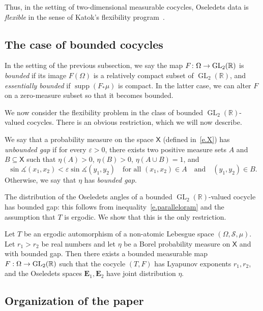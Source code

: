 \documentclass[AHL,Unicode,longabstracts,published]{cedram}
\DeclareMathOperator{\supp}{supp}
\newcommand{\R}{\mathbb{R}}
\newcommand{\E}{\mathbf{E}}
\newcommand{\sfX}{\mathsf{X}}
\newcommand{\clS}{\mathcal{S}}
\DeclareMathOperator{\GL}{GL}
\renewcommand{\epsilon}{\varepsilon}
\renewcommand{\angle}{\measuredangle}
\renewcommand*{\to}{\mathchoice{\longrightarrow}{\rightarrow}{\rightarrow}{\rightarrow}}
\DeclareMathOperator{\GL}{GL}
\newcommand{\R}{\mathbb{R}}
\begin{document}
Thus, in the setting of two-dimensional measurable cocycles, Oseledets data is \emph{flexible} in the sense of Katok's flexibility program~\cite{BKRH}.


\subsection{The case of bounded cocycles}

In the setting of the previous subsection, we say the map $F \colon \Omega \to \GL_2(\R)$ is \emph{bounded} if its image $F(\Omega)$ is a relatively compact subset of $\GL_2(\R)$, and \emph{essentially bounded} if $\supp(F_*\mu)$ is compact. In the latter case, we can alter $F$ on a zero-measure subset so that it becomes bounded.

We now consider the flexibility problem in the class of bounded $\GL_2(\R)$-valued cocycles. There is an obvious restriction, which we will now describe.

We say that a probability measure on the space $\sfX$ (defined in~\eqref{e.X}) has \emph{unbounded gap} if for every $\epsilon>0$, there exists two positive measure sets $A$ and $B \subseteq \sfX$ such that $\eta(A)>0$, $\eta(B)>0$, $\eta(A \cup B) = 1$, and
\begin{equation}
\sin \angle(x_1,x_2) < \epsilon \sin\angle(y_1,y_2) \quad \text{for all }(x_1,x_2)\in A\quad\text{and}\quad (y_1,y_2)\in B.
\end{equation}
Otherwise, we say that $\eta$ has \emph{bounded gap}.

The distribution of the Oseledets angles of a bounded $\GL_2(\R)$-valued cocycle has bounded gap: this follows from inequality~\eqref{e.paralleloram} and the assumption that $T$ is ergodic. We show that this is the only restriction.

\begin{theo}\label{t.boundedflexible}
Let $T$ be an ergodic automorphism of a non-atomic Lebesgue space $(\Omega,\clS,\mu)$. Let $r_1 > r_2$ be real numbers and let $\eta$ be a Borel probability measure on $\sfX$ and with bounded gap. Then there exists a bounded measurable map ${F:\Omega \to \GL_2(\R)}$ such that the cocycle $(T,F)$ has Lyapunov exponents $r_1,r_2$, and the Oseledets spaces $\E_1,\E_2$ have joint distribution $\eta$.
\end{theo}

\subsection{Organization of the paper}
\end{document}
